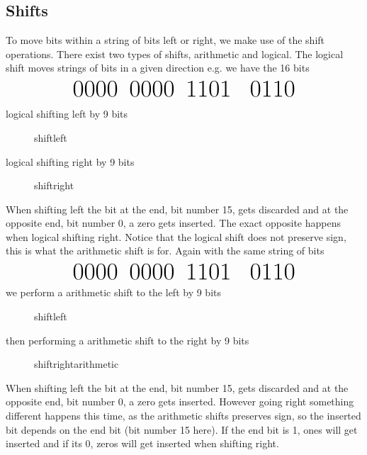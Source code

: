     \subsection{Shifts}
        To move bits within a string of bits left or right, we make use of the shift operations. There exist two types of shifts, arithmetic and logical.
        The logical shift moves strings of bits in a given direction e.g. we have the 16 bits
        \begin{equation*}
            \text{\Huge 0000\, 0000\, 1101 \, 0110}
        \end{equation*}
        
        logical shifting left by 9 bits
        \begin{figure*}[h!]
            \centering
            {shiftleft}
        \end{figure*}
     
        logical shifting right by 9 bits
        \begin{figure*}[h!]
            \centering
            {shiftright}
        \end{figure*} 

        When shifting left the bit at the end, bit number 15, gets discarded and at the opposite end, bit number 0, a zero gets inserted. The exact opposite happens when logical shifting right. Notice that the logical shift does not preserve sign, this is what the arithmetic shift is for. Again with the same string of bits
        \begin{equation*}
            \text{\Huge 0000\, 0000\, 1101 \, 0110}
        \end{equation*}
        we perform a arithmetic shift to the left by 9 bits
        \begin{figure*}[h!]
            \centering
            {shiftleft}
        \end{figure*}
    
        then performing a arithmetic shift to the right by 9 bits
        \begin{figure*}[h!]
            \centering
            {shiftrightarithmetic}
        \end{figure*}
        
        When shifting left the bit at the end, bit number 15, gets discarded and at the opposite end, bit number 0, a zero gets inserted. However going right something different happens this time, as the arithmetic shifts preserves sign, so the inserted bit depends on the end bit (bit number 15 here). If the end bit is 1, ones will get inserted and if its 0, zeros will get inserted when shifting right.
        
